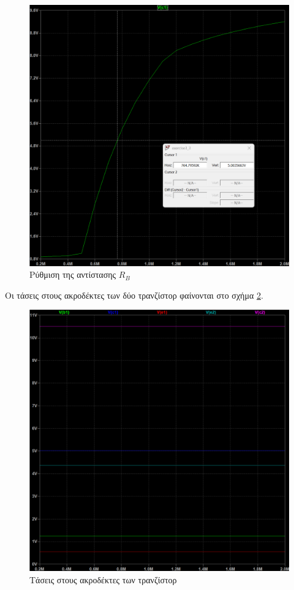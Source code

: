 \documentclass[11pt,a4paper,twoside,onecolumn,openright,final]{memoir}
\begin{document}
\begin{figure}[H]
\centerfloat%
\includegraphics[width=12.0cm]{figures/exercise3plot1.png}
\caption{Ρύθμιση της αντίστασης \(R_B\)}\label{fig:ex3plot1}
\end{figure}

Οι τάσεις στους ακροδέκτες των δύο τρανζίστορ φαίνονται στο σχήμα \ref{fig:ex3plot2}.

\begin{figure}[H]
\centerfloat%
\includegraphics[width=12.0cm]{figures/exercise3_1plot_DC.png}
\caption{Τάσεις στους ακροδέκτες των τρανζίστορ}\label{fig:ex3plot2}
\end{figure}
\end{document}
